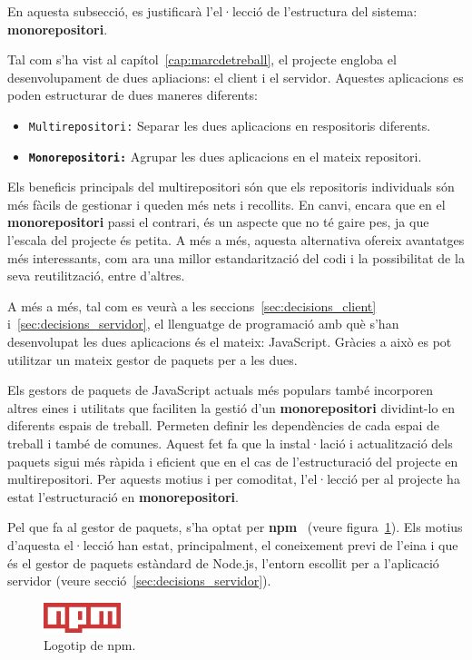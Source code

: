 \documentclass[a4paper,12pt]{ThesisStyle}
\begin{document}
En aquesta subsecció, es justificarà l'el·lecció de l'estructura del sistema: \textbf{monorepositori}.

Tal com s'ha vist al capítol~\ref{cap:marcdetreball}, el projecte engloba el desenvolupament de dues apliacions: el client i el servidor. Aquestes aplicacions es poden estructurar de dues maneres diferents:
\begin{itemize}
  \item \texttt{Multirepositori:} Separar les dues aplicacions en respositoris diferents. 
  \item \texttt{\textbf{Monorepositori:}} Agrupar les dues aplicacions en el mateix repositori.
\end{itemize}

Els beneficis principals del multirepositori són que els repositoris individuals són més fàcils de gestionar i queden més nets i recollits. En canvi, encara que en el \textbf{monorepositori} passi el contrari, és un aspecte que no té gaire pes, ja que l'escala del projecte és petita. A més a més, aquesta alternativa ofereix avantatges més interessants, com ara una millor estandarització del codi i la possibilitat de la seva reutilització, entre d'altres.

A més a més, tal com es veurà a les seccions~\ref{sec:decisions_client} i~\ref{sec:decisions_servidor}, el llenguatge de programació amb què s'han desenvolupat les dues aplicacions és el mateix: JavaScript. Gràcies a això es pot utilitzar un mateix gestor de paquets per a les dues.

Els gestors de paquets de JavaScript actuals més populars també incorporen altres eines i utilitats que faciliten la gestió d'un \textbf{monorepositori} dividint-lo en diferents espais de treball. Permeten definir les dependències de cada espai de treball i també de comunes. Aquest fet fa que la instal·lació i actualització dels paquets sigui més ràpida i eficient que en el cas de l'estructuració del projecte en multirepositori. Per aquests motius i per comoditat, l'el·lecció per al projecte ha estat l'estructuració en \textbf{monorepositori}.

Pel que fa al gestor de paquets, s'ha optat per \textbf{npm}~\cite{npm} (veure figura~\ref{img:logo_npm}). Els motius d'aquesta el·lecció han estat, principalment, el coneixement previ de l'eina i que és el gestor de paquets estàndard de Node.js, l'entorn escollit per a l'aplicació servidor (veure secció~\ref{sec:decisions_servidor}).

\begin{figure}[H]
  \centering
  \includegraphics[width=0.2\textwidth]{assets/logos/NPM.png}
  \caption{\label{img:logo_npm}Logotip de npm.}
\end{figure}
\end{document}
